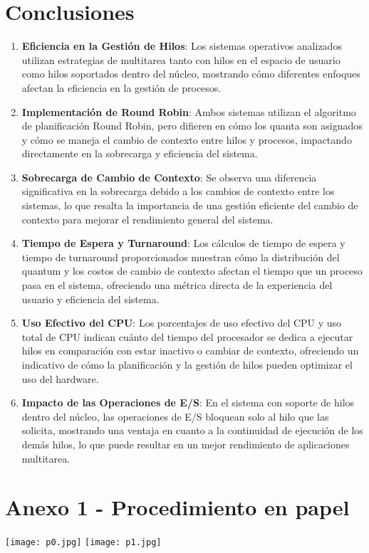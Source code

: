 \documentclass{article}
\begin{document}
\section{Conclusiones}
\begin{enumerate}
	\item  \textbf{Eficiencia en la Gestión de Hilos}: Los sistemas operativos 
	analizados utilizan estrategias de multitarea tanto con hilos en 
	el espacio de usuario como hilos soportados dentro del núcleo, 
	mostrando cómo diferentes enfoques afectan la eficiencia en la 
	gestión de procesos.
	\item  \textbf{Implementación de Round Robin}: Ambos sistemas utilizan el 
	algoritmo de planificación Round Robin, pero difieren en cómo 
	los quanta son asignados y cómo se maneja el cambio de contexto 
	entre hilos y procesos, impactando directamente en la sobrecarga y
	eficiencia del sistema.
	\item  \textbf{Sobrecarga de Cambio de Contexto}: Se observa una diferencia 
	significativa en la sobrecarga debido a los cambios de contexto 
	entre los sistemas, lo que resalta la importancia de una gestión 
	eficiente del cambio de contexto para mejorar el rendimiento 
	general del sistema.
	\item  \textbf{Tiempo de Espera y Turnaround}: Los cálculos de tiempo de 
	espera y tiempo de turnaround proporcionados muestran cómo la 
	distribución del quantum y los costos de cambio de contexto
	afectan el tiempo que un proceso pasa en el sistema, ofreciendo 
	una métrica directa de la experiencia del usuario y eficiencia 
	del sistema.
	\item  \textbf{Uso Efectivo del CPU}: Los porcentajes de uso efectivo del 
	CPU y uso total de CPU indican cuánto del tiempo del procesador 
	se dedica a ejecutar hilos en comparación con estar inactivo o 
	cambiar de contexto, ofreciendo un indicativo de cómo la 
	planificación y la gestión de hilos pueden optimizar el uso 
	del hardware.
	\item  \textbf{Impacto de las Operaciones de E/S}: En el sistema con 
	soporte de hilos dentro del núcleo, las operaciones de E/S 
	bloquean solo al hilo que las solicita, mostrando una ventaja 
	en cuanto a la continuidad de ejecución de los demás hilos, 
	lo que puede resultar en un mejor rendimiento de aplicaciones 
	multitarea.
\end{enumerate}

\section{Anexo 1 - Procedimiento en papel}
\texttt{[image: p0.jpg]}
\texttt{[image: p1.jpg]}

\renewcommand{\listfigurename}{Indice de Capturas de Pantalla}
\listoffigures 
\addcontentsline{toc}{section}{\listfigurename} 
\end{document}
